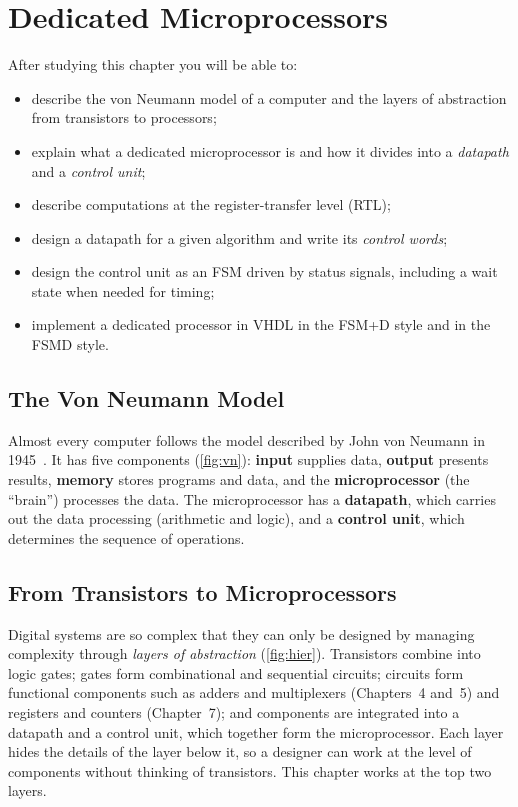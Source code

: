 \chapter{Dedicated Microprocessors}\label{ch:dedicated}

\begin{objectives}
After studying this chapter you will be able to:
\begin{itemize}
  \item describe the von Neumann model of a computer and the layers of abstraction from transistors to processors;
  \item explain what a dedicated microprocessor is and how it divides into a \emph{datapath} and a \emph{control unit};
  \item describe computations at the register-transfer level (RTL);
  \item design a datapath for a given algorithm and write its \emph{control words};
  \item design the control unit as an FSM driven by status signals, including a wait state when needed for timing;
  \item implement a dedicated processor in VHDL in the FSM+D style and in the FSMD style.
\end{itemize}
\end{objectives}

\section{The Von Neumann Model}\label{sec:vonneumann}
Almost every computer follows the model described by John von Neumann in 1945~\cite{vonneumann1945}. It has five components (\cref{fig:vn}): \textbf{input} supplies data, \textbf{output} presents results, \textbf{memory} stores programs and data, and the \textbf{microprocessor} (the ``brain'') processes the data. The microprocessor has a \textbf{datapath}, which carries out the data processing (arithmetic and logic), and a \textbf{control unit}, which determines the sequence of operations.


\section{From Transistors to Microprocessors}
Digital systems are so complex that they can only be designed by managing complexity through \emph{layers of abstraction} (\cref{fig:hier}). Transistors combine into logic gates; gates form combinational and sequential circuits; circuits form functional components such as adders and multiplexers (Chapters~4 and~5) and registers and counters (Chapter~7); and components are integrated into a datapath and a control unit, which together form the microprocessor. Each layer hides the details of the layer below it, so a designer can work at the level of components without thinking of transistors. This chapter works at the top two layers.

